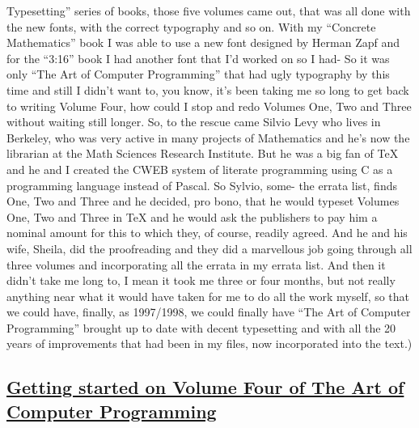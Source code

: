 \documentclass[]{article}
\begin{document}
Typesetting'' series of books, those five volumes came out, that was all
done with the new fonts, with the correct typography and so on. With my
``Concrete Mathematics'' book I was able to use a new font designed by
Herman Zapf and for the ``3:16'' book I had another font that I'd worked
on so I had- So it was only ``The Art of Computer Programming'' that had
ugly typography by this time and still I didn't want to, you know, it's
been taking me so long to get back to writing Volume Four, how could I
stop and redo Volumes One, Two and Three without waiting still longer.
So, to the rescue came Silvio Levy who lives in Berkeley, who was very
active in many projects of Mathematics and he's now the librarian at the
Math Sciences Research Institute. But he was a big fan of TeX and he and
I created the CWEB system of literate programming using C as a
programming language instead of Pascal. So Sylvio, some- the errata
list, finds One, Two and Three and he decided, pro bono, that he would
typeset Volumes One, Two and Three in TeX and he would ask the
publishers to pay him a nominal amount for this to which they, of
course, readily agreed. And he and his wife, Sheila, did the
proofreading and they did a marvellous job going through all three
volumes and incorporating all the errata in my errata list. And then it
didn't take me long to, I mean it took me three or four months, but not
really anything near what it would have taken for me to do all the work
myself, so that we could have, finally, as 1997/1998, we could finally
have ``The Art of Computer Programming'' brought up to date with decent
typesetting and with all the 20 years of improvements that had been in
my files, now incorporated into the text.)

\subsection{\texorpdfstring{\href{http://webofstories.com/play/17141}{Getting
started on Volume Four of The Art of Computer
Programming}}{Getting started on Volume Four of The Art of Computer Programming}}\label{getting-started-on-volume-four-of-the-art-of-computer-programming}
\end{document}
